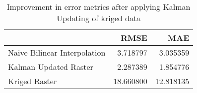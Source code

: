 \begin{table}
\caption{Improvement in error metrics after applying Kalman Updating of kriged data}
\label{tab:oahu1_gebco_raster_error}
\begin{tabular}{lrr}
\toprule
 & RMSE & MAE \\
\midrule
Naive Bilinear Interpolation & 3.718797 & 3.035359 \\
Kalman Updated Raster & 2.287389 & 1.854776 \\
Kriged Raster & 18.660800 & 12.818135 \\
\bottomrule
\end{tabular}
\end{table}
